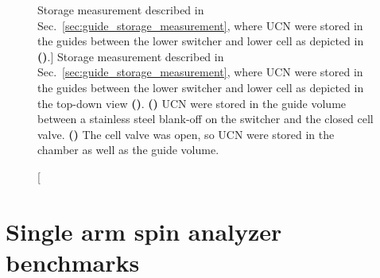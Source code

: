 \begin{figure}
\begin{subfigure}{\textwidth}
  \caption{}\label{subfig:2022_guide_storage_schematic}
\end{subfigure}
\caption
    [Storage measurement described in Sec.~\ref{sec:guide_storage_measurement}, where UCN were stored in the guides between the lower switcher and lower cell as depicted in \textbf{()}.]
    {Storage measurement described in Sec.~\ref{sec:guide_storage_measurement}, where UCN were stored in the guides between the lower switcher and lower cell as depicted in the top-down view \textbf{()}. \textbf{()} UCN were stored in the guide volume between a stainless steel blank-off on the switcher and the closed cell valve. \textbf{()} The cell valve was open, so UCN were stored in the chamber as well as the guide volume.}
\label{fig:2022_ucn_guide_storage}
\end{figure}



\section{Single arm spin analyzer benchmarks}\label{sec:2022_single_arm_benchmarks}



